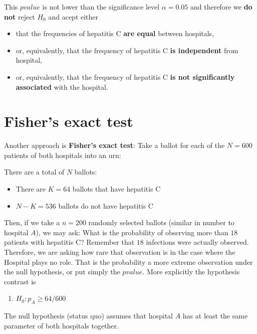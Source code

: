 \documentclass[
]{book}
\providecommand{\tightlist}{%
  \setlength{\itemsep}{0pt}\setlength{\parskip}{0pt}}
\begin{document}
This \(pvalue\) is not lower than the significance level \(\alpha=0.05\) and therefore we \textbf{do not} reject \(H_0\) and acept either

\begin{itemize}
\item
  that the frequencies of hepatitis C \textbf{are equal} between hospitals,
\item
  or, equivalently, that the frequency of hepatitis C \textbf{is independent} from hospital,
\item
  or, equivalently, that the frequency of hepatitis C \textbf{is not significantly associated} with the hospital.
\end{itemize}

\hypertarget{fishers-exact-test}{%
\section{Fisher's exact test}\label{fishers-exact-test}}

Another approach is \textbf{Fisher's exact test}: Take a ballot for each of the \(N=600\) patients of both hospitals into an urn:

There are a total of \(N\) ballots:

\begin{itemize}
\tightlist
\item
  There are \(K=64\) ballots that have hepatitis C
\item
  \(N-K=536\) ballots do not have hepatitis C
\end{itemize}

Then, if we take a \(n=200\) randomly selected ballots (similar in number to hospital \(A\)), we may ask: What is the probability of observing more than \(18\) patients with hepatitis C? Remember that \(18\) infections were actually observed. Therefore, we are asking how rare that observation is in the case where the Hospital plays no role. That is the probability a more extreme observation under the null hypothesis, or put simply the \(pvalue\). More explicitly the hypothesis contrast is

\begin{enumerate}
\def\labelenumi{\alph{enumi}.}
\tightlist
\item
  \(H_0: p_A \geq 64/600\)
\end{enumerate}

The null hypothesis (status quo) assumes that hospital \(A\) has at least the same parameter of both hospitals together.
\end{document}
